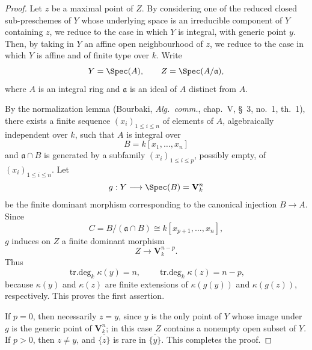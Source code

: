 \begin{proof}
Let $z$ be a maximal point of $Z$.
By considering one of the reduced closed sub-preschemes of $Y$ whose underlying space is an irreducible component of $Y$ containing $z$, we reduce to the case in which $Y$ is integral, with generic point $y$.
Then, by taking in $Y$ an affine open neighbourhood of $z$, we reduce to the case in which $Y$ is affine and of finite type over $k$.
Write
\[
Y=\Spec(A),
\qquad
Z=\Spec(A/\mathfrak a),
\]
where $A$ is an integral ring and $\mathfrak a$ is an ideal of $A$ distinct from $A$.

By the normalization lemma (Bourbaki, \emph{Alg.\ comm.}, chap.~V, \S~3, no.~1, th.~1), there exists a finite sequence $(x_i)_{1\leq i\leq n}$ of elements of $A$, algebraically independent over $k$, such that $A$ is integral over
\[
B=k[x_1,\ldots,x_n]
\]
and $\mathfrak a\cap B$ is generated by a subfamily $(x_i)_{1\leq i\leq p}$, possibly empty, of $(x_i)_{1\leq i\leq n}$.
Let
\[
g:Y\longrightarrow\Spec(B)=\mathbf{V}_k^n
\]
be the finite dominant morphism corresponding to the canonical injection $B\to A$.
Since
\[
C=B/(\mathfrak a\cap B)
\cong k[x_{p+1},\ldots,x_n],
\]
$g$ induces on $Z$ a finite dominant morphism
\[
Z\longrightarrow\mathbf{V}_k^{n-p}.
\]
Thus
\[
\operatorname{tr.deg}_k\kappa(y)=n,
\qquad
\operatorname{tr.deg}_k\kappa(z)=n-p,
\]
because $\kappa(y)$ and $\kappa(z)$ are finite extensions of $\kappa(g(y))$ and $\kappa(g(z))$, respectively.
This proves the first assertion.

If $p=0$, then necessarily $z=y$, since $y$ is the only point of $Y$ whose image under $g$ is the generic point of $\mathbf{V}_k^n$; in this case $Z$ contains a nonempty open subset of $Y$.
If $p>0$, then $z\neq y$, and $\overline{\{z\}}$ is rare in $\overline{\{y\}}$.
This completes the proof.
\end{proof}

